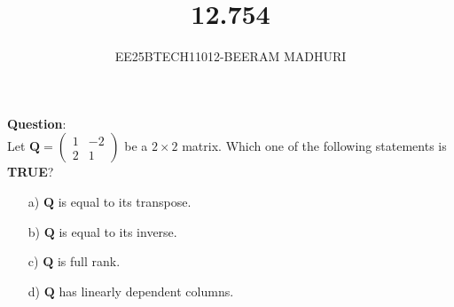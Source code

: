 \documentclass[journal]{IEEEtran}
\begin{document}

\vspace{3cm}

\title{12.754}
\author{EE25BTECH11012-BEERAM MADHURI}
{\let\newpage\relax\maketitle}

\renewcommand{\thefigure}{\theenumi}
\renewcommand{\thetable}{\theenumi}
\setlength{\intextsep}{10pt} %


\renewcommand{\thetable}{\theenumi}


\textbf{Question}:\\
Let $\mathbf{Q} = \begin{pmatrix} 1 & -2 \\ 2 & 1 \end{pmatrix}$ be a $2\times2$ matrix. Which one of the following statements is \textbf{TRUE}?

\begin{enumerate}
    \item[a)] $\mathbf{Q}$ is equal to its transpose.
    \item[b)] $\mathbf{Q}$ is equal to its inverse.
    \item[c)] $\mathbf{Q}$ is full rank.
    \item[d)] $\mathbf{Q}$ has linearly dependent columns.
\end{enumerate}
\end{document}
